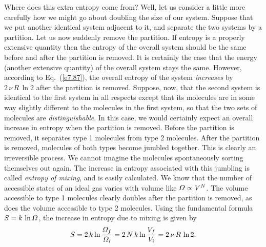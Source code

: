 Where does this extra entropy come from? Well, let us consider a little more carefully
how we might go about doubling the size of our system. Suppose that we put
another identical system  adjacent to it,  and separate the two
systems  by a partition.
Let us now suddenly remove the partition. If entropy is
a properly extensive quantity then the entropy of the overall system
should be the same before and after the partition is removed. It is certainly the
case that the energy (another extensive quantity) of the overall system stays the
same. However, according to Eq.~(\ref{e7.87}), the overall entropy of the system 
{\em increases}\/ by
$2\,\nu\, R\, \ln 2 $ after the partition is removed. Suppose, now, that the second system
is identical to the first system in all
respects except that its molecules are in some way slightly
different to the molecules in the first system, so that the two sets of
molecules are  {\em distinguishable}. 
In this case, we would certainly expect an overall
increase in
entropy when the partition is removed. Before the partition is removed,
it separates type 1 molecules from type 2 molecules. 
After the partition is removed, molecules of both
types become jumbled together. This is clearly an
irreversible process. We cannot imagine the molecules spontaneously sorting
themselves out again. The increase in entropy associated with this jumbling is
called {\em entropy of mixing}, and is easily calculated. We know that the number
of accessible states of an ideal gas varies with volume like ${\mit\Omega}\propto
V^N$. The volume accessible to type 1 molecules clearly doubles after the
partition is removed, as does the volume accessible to type 2 molecules.
Using the fundamental formula $S= k\, \ln {\mit\Omega}$, the increase in entropy
due to mixing is given by
\begin{equation}
S = 2\, k\ln \frac{{\mit\Omega}_f}{{\mit\Omega}_i} = 2\,N \,k\ln \frac{V_f}{V_i} =
 2\,\nu\, R\, \ln 2.
\end{equation}

